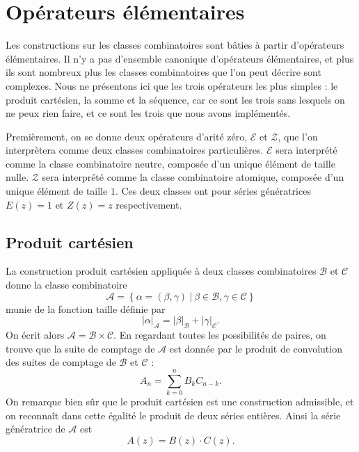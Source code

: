 \documentclass[12pt]{report}
\begin{document}
\section{Opérateurs élémentaires}
Les constructions sur les classes combinatoires sont bâties à partir d'opérateurs élémentaires. Il n'y a pas d'ensemble canonique d'opérateurs élémentaires, et plus ils sont nombreux plus les classes combinatoires que l'on peut décrire sont complexes. Nous ne présentons ici que les trois opérateurs les plus simples : le produit cartésien, la somme et la séquence, car ce sont les trois sans lesquels on ne peux rien faire, et ce sont les trois que nous avons implémentés.

Premièrement, on se donne deux opérateurs d'arité zéro, $\mathcal E$ et $\mathcal Z$, que l'on interprètera comme deux classes combinatoires particulières. 
$\mathcal E$ sera interprété comme la classe combinatoire neutre, composée d'un unique élément de taille nulle.
$\mathcal Z$ sera interprété comme la classe combinatoire atomique, composée d'un unique élément de taille $1$.
Ces deux classes ont pour séries génératrices $E(z)=1$ et $Z(z)=z$ respectivement.

\subsection*{Produit cartésien}
La construction produit cartésien appliquée à deux classes combinatoires $\mathcal B$ et $\mathcal C$ donne la classe combinatoire 
$$\mathcal A = \left\{\alpha =(\beta,\gamma)\ |\ \beta \in \mathcal B, \gamma \in\mathcal C\right\}$$
munie de la fonction taille définie par 
$$|\alpha|_{\mathcal A} = |\beta|_{\mathcal B} +|\gamma|_{\mathcal C}.$$
On écrit alors $\mathcal A = \mathcal B \times \mathcal C$.
En regardant toutes les possibilités de paires, on trouve que la suite de comptage de $\mathcal A$ est donnée par le produit de convolution des suites de comptage de $\mathcal B$ et $\mathcal C$ :
$$A_n = \sum_{k=0}^n B_k C_{n-k}.$$
On remarque bien sûr que le produit cartésien est une construction admissible, et on reconnaît dans cette égalité le produit de deux séries entières. Ainsi la série génératrice de $\mathcal A$ est 
$$A(z) = B(z)\cdot C(z).$$
\end{document}
